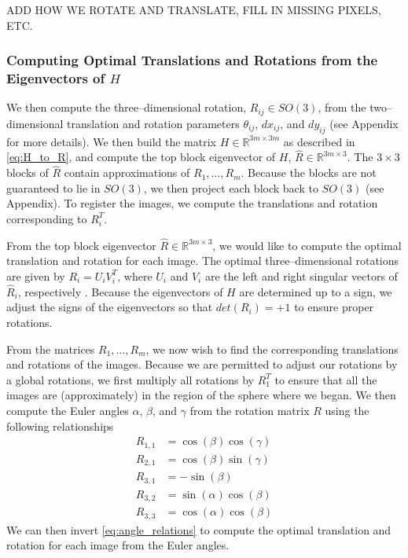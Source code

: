 \documentclass[11pt]{article}
\begin{document}
ADD HOW WE ROTATE AND TRANSLATE, FILL IN MISSING PIXELS, ETC.

\subsubsection{Computing Optimal Translations and Rotations from the Eigenvectors of $H$}

%
We then compute the three--dimensional rotation, $R_{ij} \in SO(3)$, from the two--dimensional translation and rotation parameters $\theta_{ij}$, $dx_{ij}$, and $dy_{ij}$ (see Appendix for more details).
%
We then build the matrix $H \in \mathbb{R}^{3m \times 3m}$ as described in \eqref{eq:H_to_R}, and compute the top block eigenvector of $H$, $\hat{R} \in \mathbb{R}^{3m \times 3}.$ 
%
The $3 \times 3$ blocks of $\hat{R}$ contain approximations of $R_1, \dots, R_m$.  
%
Because the blocks are not guaranteed to lie in $SO(3)$, we then project each block back to $SO(3)$ (see Appendix).
%
To register the images, we compute the translations and rotation corresponding to $R_i^T$. 

From the top block eigenvector $\hat{R} \in \mathbb{R}^{3m \times 3}$, we would like to compute the optimal translation and rotation for each image. 
%
The optimal three--dimensional rotations are given by $R_i = U_i V_i^T$, where $U_i$ and $V_i$ are the left and right singular vectors of $\hat{R}_i$, respectively \cite{...}. 
%
Because the eigenvectors of $H$ are determined up to a sign, we adjust the signs of the eigenvectors so that $det(R_i) = +1$ to ensure proper rotations.

From the matrices $R_1, \dots, R_m$, we now wish to find the corresponding translations and rotations of the images.
%
Because we are permitted to adjust our rotations by a global rotations, we first multiply all rotations by $R_1^T$ to ensure that all the images are (approximately) in the region of the sphere where we began.
%
We then compute the Euler angles $\alpha$, $\beta$, and $\gamma$ from the rotation matrix $R$ using the following relationships
\begin{equation}
\begin{aligned}
R_{1,1} & = \cos(\beta)\cos(\gamma) \\
R_{2,1} & = \cos(\beta)\sin(\gamma) \\
R_{3,1} & = -\sin(\beta) \\
R_{3,2} & = \sin(\alpha)\cos(\beta) \\
R_{3,3} & = \cos(\alpha)\cos(\beta) 
\end{aligned}
\end{equation}
%
We can then invert \eqref{eq:angle_relations} to compute the optimal translation and rotation for each image from the Euler angles.



\end{document}
